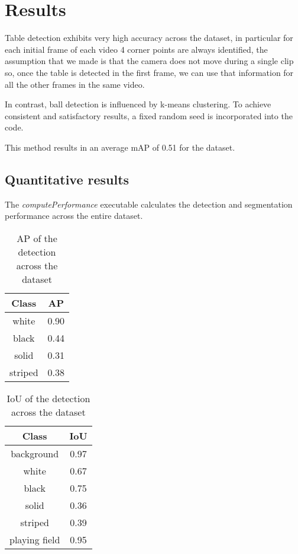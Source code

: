 \section{Results}

Table detection exhibits very high accuracy across the dataset, in particular for each initial frame of each video 4 corner points are always identified, the assumption that we made is that the camera does not move during a single clip so, once the table is detected in the first frame, we can use that information for all the other frames in the same video.

In contrast, ball detection is influenced by k-means clustering. To achieve consistent and satisfactory results, a fixed random seed is incorporated into the code. %

This method results in an average mAP of 0.51 for the dataset.	%


\subsection{Quantitative results}
The \textit{computePerformance} executable calculates the detection and segmentation performance across the entire dataset.
\begin{table}[H]
	\centering
	\begin{tabular}{|c|c|}
		\hline
		\textbf{Class} & \textbf{AP} \\
		\hline
		white & 0.90 \\
		\hline
		black & 0.44 \\
		\hline
		solid & 0.31 \\
		\hline
		striped & 0.38 \\
		\hline
	\end{tabular}
	\caption{AP of the detection across the dataset}
	\label{tab: AP across dataset}
\end{table}

\begin{table}[H]
	\centering
	\begin{tabular}{|c|c|}
		\hline
		\textbf{Class} & \textbf{IoU} \\
		\hline
		background & 0.97 \\
		\hline
		white & 0.67 \\
		\hline
		black & 0.75 \\
		\hline
		solid & 0.36 \\
		\hline
		striped & 0.39 \\
		\hline
		playing field & 0.95 \\
		\hline
	\end{tabular}
	\caption{IoU of the detection across the dataset}
	\label{tab: IoU across dataset}
\end{table}

